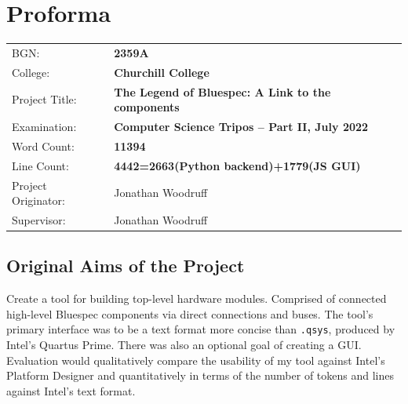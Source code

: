 \documentclass[12pt]{report}
\begin{document}
\chapter*{Proforma}
{
\begin{tabular}{ll}
BGN:               & \bf 2359A                      \\
College:            & \bf Churchill College                     \\
Project Title:      & \bf The Legend of Bluespec: A Link to the components \\
Examination:        & \bf Computer Science Tripos -- Part II, July 2022  \\
Word Count:         & \bf 11394 \footnotemark[1]  \\
Line Count:         & \bf 4442=2663(Python backend)+1779(JS GUI) \footnotemark[2]  \\
Project Originator: & Jonathan Woodruff                   \\
Supervisor:         & Jonathan Woodruff                    \\ 
\end{tabular}
}



\section*{Original Aims of the Project}

Create a tool for building top-level hardware modules. Comprised of connected high-level Bluespec components via direct connections and buses. The tool's primary interface was to be a text format more concise than \verb!.qsys!, produced by Intel's Quartus Prime. There was also an optional goal of creating a GUI. Evaluation would qualitatively compare the usability of my tool against Intel's Platform Designer and quantitatively in terms of the number of tokens and lines against Intel's text format.
\end{document}

